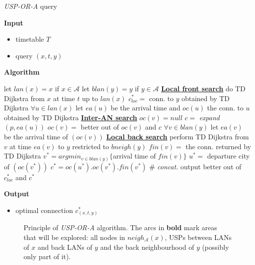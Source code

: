 \documentclass{svk_long_en}
\newcommand{\cmt}[1]{{\color{cmt-clr} \hspace*{1cm} \# \textit{#1}}}
\newcommand{\algsec}[1]{\textcolor{algsec-clr}{\textbf{\underline{#1}}}}
\newcommand{\inputTikZ}[1]{%
    \beginpgfgraphicnamed{#1-external}%
    \endpgfgraphicnamed%
}
\begin{document}
		\color{algcolor}
		\begin{algorithm}[H]
			\color{inalgcolor}
			\caption{\textit{USP-OR-A} query}
			\label{alg:uspora-query}
			\textbf{Input} 
			\begin{itemize}
				\item timetable $T$
				\item query $(x, t, y)$
			\end{itemize}
			\textbf{Algorithm}
			\begin{algorithmic}
				\STATE let $lan(x) = x$ if $x \in \mathcal{A}$
				\STATE let $blan(y) = y$ if $y \in \mathcal{A}$
				\STATE \algsec{Local front search}
				\STATE do TD Dijkstra from $x$ at time $t$ up to $lan(x)$
					\STATE $c_{loc}^{*} =$ conn. to $y$ obtained by TD Dijkstra
				\ENDIF
				\STATE $\forall u \in lan(x)$ let $ea(u)$ be the arrival time and $oc(u)$ the conn. to $u$ obtained by TD Dijkstra
				\STATE \algsec{Inter-AN search}
					\STATE $oc(v) = null$
							\STATE $c =$ \textit{expand}$(p, ea(u))$
							\STATE $oc(v) =$ better out of $oc(v)$ and $c$
						\ENDFOR
					\ENDFOR
				\ENDFOR
				\STATE $\forall v \in blan(y)$ let $ea(v)$ be the arrival time of $(oc(v))$
				\STATE \algsec{Local back search}
					\STATE perform TD Dijkstra from $v$ at time $ea(v)$ to $y$ restricted to $bneigh(y)$
					\STATE $fin(v) =$ the conn. returned by TD Dijkstra	
				\ENDFOR
				\STATE $v^{*} = argmin_{v \in blan(y)} \{$arrival time of $fin(v)\}$
				\STATE $u^{*} =$ departure city of $(oc(v^{*}))$
				\STATE $c^{*} = oc(u^{*}) . oc(v^{*}) . fin(v^{*})$ \cmt{concat.}
				\STATE output better out of $c_{loc}^{*}$ and $c^{*}$
			\end{algorithmic}
			\textbf{Output}
			\begin{itemize}
				\item optimal connection $c_{(x, t, y)}^{*}$
			\end{itemize}
		\end{algorithm}
		\color{black}
				
		\begin{figure}[h!]
			\begin{center}
				\scriptsize
				\inputTikZ{./tikzpics/uspora}
			\end{center}
			\caption{\label{fig:uspora} Principle of \textit{USP-OR-A} algorithm. The arcs in \textbf{bold} mark areas that will be explored: all nodes in $neigh_{\mathcal{A}}(x)$, USPs between LANs of $x$ and back LANs of $y$ and the back neighbourhood of $y$ (possibly only part of it).}
		\end{figure}
		
\end{document}
